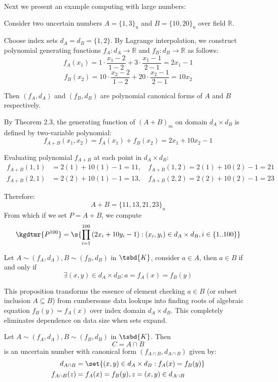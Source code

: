 \par{\noindent Next we present an example computing with large numbers:}
\begin{example}
	Consider two uncertain numbers $A = \{1, 3\}_u$ and $B = \{10, 20\}_u$ over field $\mathbb{R}$.
	
	Choose index sets $d_A = d_B = \{1, 2\}$. By Lagrange interpolation, we construct polynomial generating functions $f_A: d_A \to \mathbb{R}$ and $f_B: d_B \to \mathbb{R}$ as follows:
	$$f_A(x_1) = 1 \cdot \frac{x_1 - 2}{1 - 2} + 3 \cdot \frac{x_1 - 1}{2 - 1} = 2x_1 - 1$$
	$$f_B(x_2) = 10 \cdot \frac{x_2 - 2}{1 - 2} + 20 \cdot \frac{x_2 - 1}{2 - 1} = 10x_2$$
	
	Then $(f_A, d_A)$ and $(f_B, d_B)$ are polynomial canonical forms of $A$ and $B$ respectively.
	
	By Theorem 2.3, the generating function of $(A + B)_m$ on domain $d_A \times d_B$ is defined by two-variable polynomial:
	$$f_{A+B}(x_1, x_2) = f_A(x_1) + f_B(x_2) = 2x_1 + 10x_2 - 1$$
	
	Evaluating polynomial $f_{A+B}$ at each point in $d_A \times d_B$:
	\begin{align*}
		f_{A+B}(1, 1) &= 2(1) + 10(1) - 1 = 11, \quad f_{A+B}(1, 2) = 2(1) + 10(2) - 1 = 21 \\
		f_{A+B}(2, 1) &= 2(2) + 10(1) - 1 = 13, \quad f_{A+B}(2, 2) = 2(2) + 10(2) - 1 = 23
	\end{align*}
	
	Therefore:
	$$ A + B = \{11, 13, 21, 23\}_u$$
	From which if we set $P = A+B$, we compute \[\kgdtmr{P^{100}} = \s{\prod_{i=1}^{100}{(2x_i + 10 y_i - 1)}: (x_i,y_i) \in d_A \times d_B, i \in \{1..100\}}
	\]
\end{example}
\begin{proposition}
	Let $A \sim (f_A,d_A), B \sim (f_B,d_B)$ in $\tsbd{K}$, consider $a \in A$, then $a \in B$ if and only if \[
	\exists (x,y) \in d_A \times d_B : a=f_A(x)=f_B(y)
	\]
\end{proposition}
\begin{remark}
	This proposition transforms the essence of element checking $a \in B$ (or subset inclusion $A \subseteq B$) from cumbersome data lookups into finding roots of algebraic equation $f_B(y) = f_A(x)$ over index domain $d_A \times d_B$. This completely eliminates dependence on data size when sets expand.
\end{remark}
\begin{proposition}
	\label{prop:dang_chuan_tac_phep_giao}
	Let $A\sim (f_A,d_A), B \sim (f_B,d_B)$ in $\tsbd{K}$. Then \[
		C = A \cap B
	\]
	is an uncertain number with canonical form $(f_{A\cap B},d_{A\cap B})$ given by:
	\begin{align*}
		d_{A\cap B} &= \set{(x,y) \in d_A \times d_B : f_A(x) = f_B(y)} \\
		f_{A\cap B}(z) &= f_A(x) = f_B(y), z=(x,y) \in d_{A\cap B}
	\end{align*}
\end{proposition}
